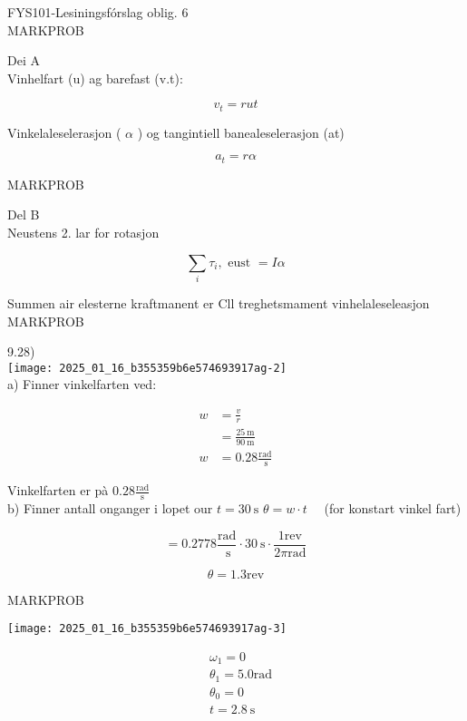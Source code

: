 \documentclass[10pt]{article}
\begin{document}
FYS101-Lesiningsfórslag oblig. 6\\

MARKPROB

Dei A\\
Vinhelfart (u) ag barefast (v.t):

$$
v_{t}=r u t
$$

Vinkelaleselerasjon ( $\alpha$ ) og tangintiell banealeselerasjon (at)

$$
a_{t}=r \alpha
$$

MARKPROB

Del B\\
Neustens 2. lar for rotasjon

$$
\sum_{i} \tau_{i}, \text { eust }=I \alpha
$$

Summen air elesterne kraftmanent er Cll treghetsmament vinhelaleseleasjon\\

MARKPROB

9.28)\\
\texttt{[image: 2025\_01\_16\_b355359b6e574693917ag-2]}\\
a) Finner vinkelfarten ved:

$$
\begin{aligned}
w & =\frac{v}{r} \\
& =\frac{25 \mathrm{~m}}{90 \mathrm{~m}} \\
w & =0.28 \frac{\mathrm{rad}}{\mathrm{~s}}
\end{aligned}
$$

Vinkelfarten er pà $0.28 \frac{\mathrm{rad}}{\mathrm{s}}$\\
b) Finner antall onganger i lopet our $t=30 \mathrm{~s}$ $\theta=w \cdot t \quad$ (for konstart vinkel fart)

$$
=0.2778 \frac{\mathrm{rad}}{\mathrm{~s}} \cdot 30 \mathrm{~s} \cdot \frac{1 \mathrm{rev}}{2 \pi \mathrm{rad}}
$$

$$
\theta=1.3 \mathrm{rev}
$$

MARKPROB

\begin{center}
\texttt{[image: 2025\_01\_16\_b355359b6e574693917ag-3]}
\end{center}

$$
\begin{aligned}
& \omega_{1}=0 \\
& \theta_{1}=5.0 \mathrm{rad} \\
& \theta_{0}=0 \\
& t=2.8 \mathrm{~s}
\end{aligned}
$$
\end{document}
